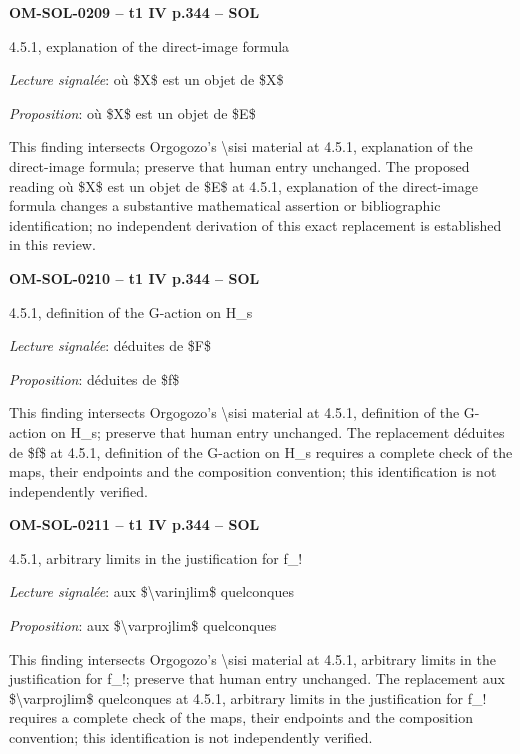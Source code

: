 \par\noindent\textbf{OM-SOL-0209 -- t1 IV p.344 -- SOL}\par
4.5.1, explanation of the direct-image formula\par
\emph{Lecture signalée}: où \$X\$ est un objet de \$X\$\par
\emph{Proposition}: où \$X\$ est un objet de \$E\$\par
This finding intersects Orgogozo's \textbackslash{}sisi material at 4.5.1, explanation of the direct-image formula; preserve that human entry unchanged. The proposed reading où \$X\$ est un objet de \$E\$ at 4.5.1, explanation of the direct-image formula changes a substantive mathematical assertion or bibliographic identification; no independent derivation of this exact replacement is established in this review.\par
\par\noindent\textbf{OM-SOL-0210 -- t1 IV p.344 -- SOL}\par
4.5.1, definition of the G-action on H\_s\par
\emph{Lecture signalée}: déduites de \$F\$\par
\emph{Proposition}: déduites de \$f\$\par
This finding intersects Orgogozo's \textbackslash{}sisi material at 4.5.1, definition of the G-action on H\_s; preserve that human entry unchanged. The replacement déduites de \$f\$ at 4.5.1, definition of the G-action on H\_s requires a complete check of the maps, their endpoints and the composition convention; this identification is not independently verified.\par
\par\noindent\textbf{OM-SOL-0211 -- t1 IV p.344 -- SOL}\par
4.5.1, arbitrary limits in the justification for f\_!\par
\emph{Lecture signalée}: aux \$\textbackslash{}varinjlim\$ quelconques\par
\emph{Proposition}: aux \$\textbackslash{}varprojlim\$ quelconques\par
This finding intersects Orgogozo's \textbackslash{}sisi material at 4.5.1, arbitrary limits in the justification for f\_!; preserve that human entry unchanged. The replacement aux \$\textbackslash{}varprojlim\$ quelconques at 4.5.1, arbitrary limits in the justification for f\_! requires a complete check of the maps, their endpoints and the composition convention; this identification is not independently verified.\par
